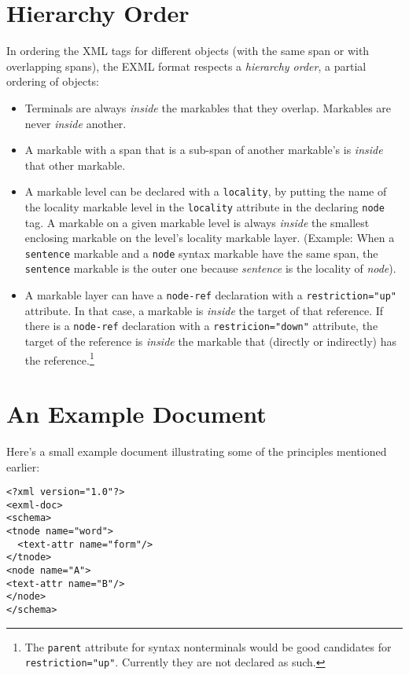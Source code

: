 \documentclass[a4paper,11pt]{report}
\begin{document}
\section{Hierarchy Order}
In ordering the XML tags for different objects (with the same span
or with overlapping spans), the EXML format respects a \emph{hierarchy order},
a partial ordering of objects:

\begin{itemize}
\item Terminals are always \emph{inside} the markables that they overlap.
Markables are never \emph{inside} another.
\item A markable with a span that is a sub-span of another markable's is
\emph{inside} that other markable.
\item A markable level can be declared with a \texttt{locality}, by
putting the name of the locality markable level in the \texttt{locality}
attribute in the declaring \texttt{node} tag. A markable on a given markable
level is always \emph{inside} the smallest enclosing markable on the level's
locality markable layer. (Example: When a \texttt{sentence} markable and
a \texttt{node} syntax markable have the same span, the \texttt{sentence}
markable is the outer one because \emph{sentence} is the locality of
\emph{node}).
\item A markable layer can have a \texttt{node-ref} declaration with a
\texttt{restriction="up"} attribute. In that case, a markable is \emph{inside}
the target of that reference. If there is a \texttt{node-ref} declaration
with a \texttt{restricion="down"} attribute, the target of the reference is \emph{inside}
the markable that (directly or indirectly) has the reference.\footnote{The \texttt{parent}
attribute for syntax nonterminals would be good candidates for \texttt{restriction="up"}.
Currently they are not declared as such.}
\end{itemize}

\section{An Example Document}
Here's a small example document illustrating some of the principles mentioned earlier:

\begin{verbatim}
<?xml version="1.0"?>
<exml-doc>
<schema>
<tnode name="word">
  <text-attr name="form"/>
</tnode>
<node name="A">
<text-attr name="B"/>
</node>
</schema>
\end{verbatim}
\end{document}
